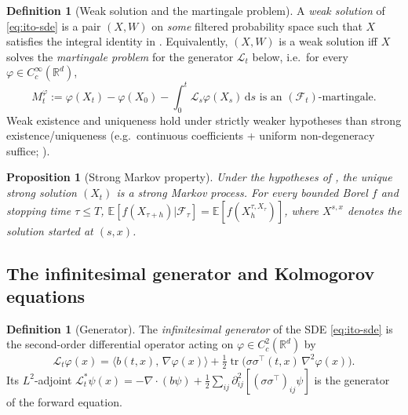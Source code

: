 \documentclass[11pt,letterpaper]{article}
\theoremstyle{plain}
\newtheorem{proposition}[theorem]{Proposition}
\theoremstyle{definition}
\newtheorem{definition}[theorem]{Definition}
\theoremstyle{remark}
\newcommand{\R}{\mathbb{R}}
\newcommand{\E}{\mathbb{E}}
\newcommand{\dd}{\mathrm{d}}
\newcommand{\calF}{\mathcal{F}}
\newcommand{\calL}{\mathcal{L}}
\newcommand{\tr}{\operatorname{tr}}
\newcommand{\grad}{\nabla}
\newcommand{\divg}{\nabla\cdot}
\newcommand{\inner}[2]{\langle #1,\,#2\rangle}
\begin{document}
\begin{definition}[Weak solution and the martingale problem]\label{def:weak}
A \emph{weak solution} of \eqref{eq:ito-sde} is a pair $(X,W)$ on
\emph{some} filtered probability space such that $X$ satisfies the
integral identity in . Equivalently,
$(X,W)$ is a weak solution iff $X$ solves the
\emph{martingale problem} for the generator $\calL_t$ below,
i.e.\ for every $\varphi\in C_c^\infty(\R^d)$,
\[
  M^\varphi_t := \varphi(X_t)-\varphi(X_0)-\int_0^t\calL_s\varphi(X_s)\,\dd s
  \text{ is an $(\calF_t)$-martingale.}
\]
Weak existence and uniqueness hold under strictly weaker hypotheses than
strong existence/uniqueness (e.g.\ continuous coefficients + uniform
non-degeneracy suffice; \citealt[Thm.~5.4.22]{karatzas1991bm}).
\end{definition}

\begin{proposition}[Strong Markov property]\label{prop:markov}
Under the hypotheses of , the unique strong solution
$(X_t)$ is a strong Markov process. For every bounded Borel $f$ and
stopping time $\tau\le T$,
$\E[f(X_{\tau+h})|\calF_\tau]=\E[f(X_h^{\tau,X_\tau})]$,
where $X^{s,x}$ denotes the solution started at $(s,x)$.
\end{proposition}

\subsection{The infinitesimal generator and Kolmogorov equations}

\begin{definition}[Generator]\label{def:generator}
The \emph{infinitesimal generator} of the SDE \eqref{eq:ito-sde} is the
second-order differential operator acting on $\varphi\in C_c^2(\R^d)$ by
\begin{equation}
  \calL_t\varphi(x)
  = \inner{b(t,x)}{\grad\varphi(x)}
  + \tfrac12\tr\!\bigl(\sigma\sigma^\top(t,x)\,\nabla^2\varphi(x)\bigr).
  \label{eq:generator}
\end{equation}
Its $L^2$-adjoint
$\calL_t^*\psi(x)=-\divg(b\psi)+\tfrac12\sum_{ij}\partial^2_{ij}[(\sigma\sigma^\top)_{ij}\psi]$
is the generator of the forward equation.
\end{definition}
\end{document}
